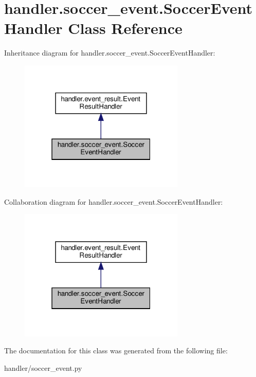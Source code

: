 \hypertarget{classhandler_1_1soccer__event_1_1_soccer_event_handler}{}\section{handler.\+soccer\+\_\+event.\+Soccer\+Event\+Handler Class Reference}
\label{classhandler_1_1soccer__event_1_1_soccer_event_handler}


Inheritance diagram for handler.\+soccer\+\_\+event.\+Soccer\+Event\+Handler\+:
\nopagebreak
\begin{figure}[H]
\begin{center}
\leavevmode
\includegraphics[width=223pt]{classhandler_1_1soccer__event_1_1_soccer_event_handler__inherit__graph}
\end{center}
\end{figure}


Collaboration diagram for handler.\+soccer\+\_\+event.\+Soccer\+Event\+Handler\+:
\nopagebreak
\begin{figure}[H]
\begin{center}
\leavevmode
\includegraphics[width=223pt]{classhandler_1_1soccer__event_1_1_soccer_event_handler__coll__graph}
\end{center}
\end{figure}


The documentation for this class was generated from the following file\+:\begin{DoxyCompactItemize}
\item 
handler/soccer\+\_\+event.\+py\end{DoxyCompactItemize}
